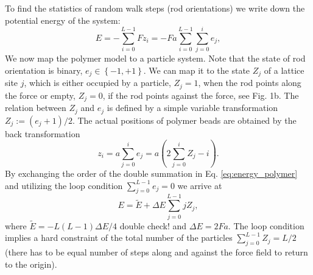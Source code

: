 \documentclass[aps,showpacs,twocolumn,floatfix,prx,superscriptaddress]{revtex4-1}
\begin{document}
To find the statistics of random walk steps (rod orientations) we write down the potential energy of the system:
\begin{equation}
    \label{eq:energy_polymer}
    E  = -\sum_{i=0}^{L-1} {Fz_i} = -Fa\sum_{i=0}^{L-1} \sum_{j=0}^{i}e_j, 
\end{equation}
We now map the polymer model to a particle system. Note that the state of rod
orientation is binary, $e_j \in \left\{-1, +1\right\}$. We can map it to the state $Z_j$ of a
lattice site $j$, which is either occupied by a particle, $Z_j = 1$, when the rod points along the force
or empty, $Z_j = 0$, if the rod points against the force, see Fig. 1b. The relation between $Z_j$ and $e_j$ is defined by a simple
variable transformation $Z_j := \left(e_j+1\right)/2$. The actual positions of polymer
beads are obtained by the back transformation
\begin{equation}
    \label{eq:z2x}
    z_i = a \sum_{j=0}^{i}{e_j} = a\left(2\sum_{j=0}^{i}{Z_j} -i\right).
\end{equation}
By exchanging the order of the double summation in Eq.
\eqref{eq:energy_polymer} and utilizing the loop condition  $\sum_{j=0}^{L-1} e_j = 0$ we 
arrive at 
\begin{equation}
    \label{eq:energy_particle}
    E = \tilde{E} + \Delta E \sum_{j=0}^{L-1} j Z_j, 
\end{equation}
where $\tilde{E}=  -L(L-1) \Delta E /4$ {\color{red} double check!} and $\Delta E = 2Fa$. The loop condition
implies a hard constraint of the total number of the particles
$\sum_{j=0}^{L-1} Z_j = L/2$ (there has to be equal number of steps along and against the force field to return to the origin).
\end{document}

